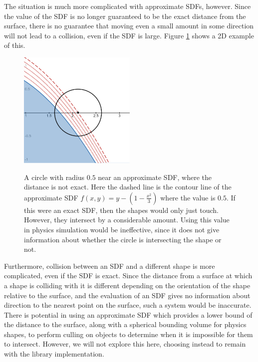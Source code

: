 \documentclass{article}
\begin{document}
The situation is much more complicated with approximate SDFs, however. Since the value of the SDF is no longer guaranteed to be the exact distance from the surface, there is no guarantee that moving even a small amount in some direction will not lead to a collision, even if the SDF is large. Figure \ref{fig:approx_collision} shows a 2D example of this.

\begin{figure}
  \caption{A circle with radius $0.5$ near an approximate SDF, where the distance is not exact. Here the dashed line is the contour line of the approximate SDF $f\left(x,y\right) = y - \left(1 - \frac{x^2}{3}\right)$ where the value is $0.5$. If this were an exact SDF, then the shapes would only just touch. However, they intersect by a considerable amount. Using this value in physics simulation would be ineffective, since it does not give information about whether the circle is intersecting the shape or not.}
  \includegraphics[width=0.5\textwidth]{approx_collision}
  \label{fig:approx_collision}
\end{figure}

Furthermore, collision between an SDF and a different shape is more complicated, even if the SDF is exact. Since the distance from a surface at which a shape is colliding with it is different depending on the orientation of the shape relative to the surface, and the evaluation of an SDF gives no information about direction to the nearest point on the surface, such a system would be inaccurate. There is potential in using an approximate SDF which provides a lower bound of the distance to the surface, along with a spherical bounding volume for physics shapes, to perform culling on objects to determine when it is impossible for them to intersect. However, we will not explore this here, choosing instead to remain with the library implementation.  
\end{document}
